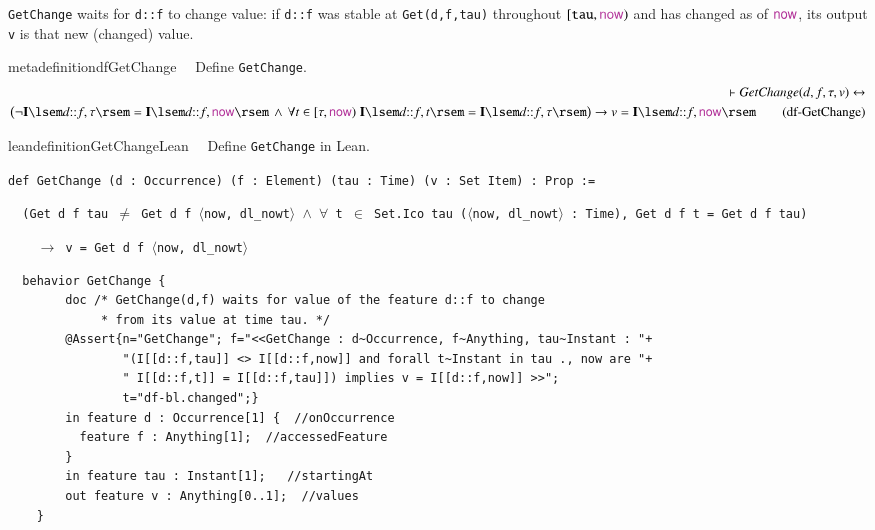 \pn \texttt{GetChange} waits for \texttt{d::f} to change value: if \texttt{d::f} was stable at
\texttt{Get(d,f,tau)} throughout $[\texttt{tau},\mathsf{\mc{now}})$ and has changed as of $\mathsf{\mc{now}}$,
its output \texttt{v} is that new (changed) value.

\begin{restatable}{metadefinition}{dfGetChange}~~ Define \texttt{GetChange}.
\begin{align}
\vdash \textit{GetChange}(d,f,\tau,v) \leftrightarrow \notag \\
  \big( \lnot \mathbf{I}\lsem d{::}f,\tau\rsem = \mathbf{I}\lsem d{::}f,\mathsf{\mc{now}}\rsem \, \wedge \,
  \forall t \in [\tau,\mathsf{\mc{now}}) \; \mathbf{I}\lsem d{::}f,t\rsem = \mathbf{I}\lsem d{::}f,\tau\rsem
  \big) \rightarrow v = \mathbf{I}\lsem d{::}f,\mathsf{\mc{now}}\rsem
\label{eq:df-GetChange}\tag{df-GetChange}
\end{align}
\end{restatable}

\begin{restatable}{leandefinition}{GetChangeLean}~~ Define \texttt{GetChange} in Lean.

\texttt{\textcolor{leancolor}{def} \textcolor{leanyellow}{GetChange} (d : Occurrence) (f : Element) (tau : Time) (v : Set Item) : Prop :=}

\texttt{~~(Get d f tau $\ne$ Get d f $\langle$now, dl\_nowt$\rangle$ $\wedge$ $\forall$ t $\in$ Set.Ico tau
($\langle$now, dl\_nowt$\rangle$ : Time), Get d f t = Get d f tau)}

\texttt{~~~~$\to$ v = Get d f $\langle$now, dl\_nowt$\rangle$}
\label{GetChange}
\end{restatable}

\begin{lstlisting}
  behavior GetChange {
		doc /* GetChange(d,f) waits for value of the feature d::f to change
		     * from its value at time tau. */
		@Assert{n="GetChange"; f="<<GetChange : d~Occurrence, f~Anything, tau~Instant : "+
				"(I[[d::f,tau]] <> I[[d::f,now]] and forall t~Instant in tau ., now are "+
				" I[[d::f,t]] = I[[d::f,tau]]) implies v = I[[d::f,now]] >>";
				t="df-bl.changed";}
		in feature d : Occurrence[1] {  //onOccurrence
		  feature f : Anything[1];  //accessedFeature
		}
		in feature tau : Instant[1];   //startingAt
		out feature v : Anything[0..1];  //values
	}
\end{lstlisting}

